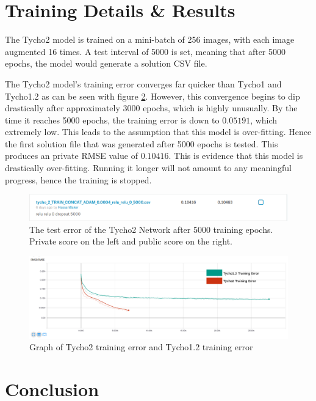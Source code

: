 \documentclass[12pt,a4paper,oneside,oldfontcommands]{memoir}
\begin{document}
\begin{Declaration Of OriginalityOrginality}
\section{Training Details \& Results}

The Tycho2 model is trained on a mini-batch of 256 images, with each image augmented 16 times. A test interval of 5000 is set, meaning that after 5000 epochs, the model would generate a solution CSV file. 

The Tycho2 model's training error converges far quicker than Tycho1 and Tycho1.2 as can be seen with figure \ref{fig:tycho-2-12-graph}. However, this convergence begins to dip drastically after approximately 3000 epochs, which is highly unusually. By the time it reaches 5000 epochs, the training error is down to \(0.05191\), which extremely low. This leads to the assumption that this model is over-fitting. Hence the first solution file that was generated after 5000 epochs is tested. This produces an private RMSE value of \(0.10416\). This is evidence that this model is drastically over-fitting. Running it longer will not amount to any meaningful progress, hence the training is stopped. 


\begin{figure}[H]
  \centering
    \includegraphics[width=\linewidth]{images/tycho2_results1.png}
    \caption{The test error of the Tycho2 Network after 5000 training epochs. Private score on the left and public score on the right.}
   \label{fig:tycho-2-result}
\end{figure}

\begin{figure}[H]
  \centering
    \includegraphics[width=\linewidth]{images/tycho2vs12.png}
    \caption{Graph of Tycho2 training error and Tycho1.2 training error}
   \label{fig:tycho-2-12-graph}
\end{figure}

\section{Conclusion}


\end{Declaration Of OriginalityOrginality}
\end{document}
